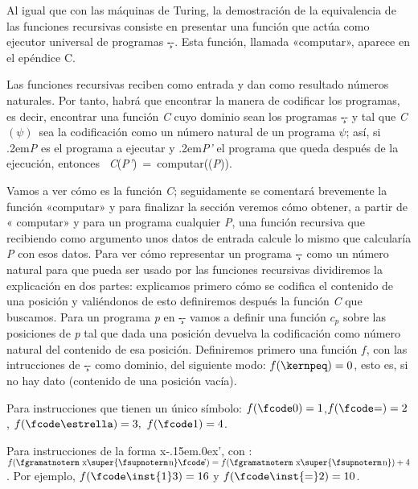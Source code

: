 Al igual que con las máquinas de Turing, la demostración de la equivalencia de las funciones
recursivas consiste en presentar una función que actúa como ejecutor universal de programas \c--.
Esta función, llamada «{\fgabrielen computar}», aparece en el epéndice C.

Las funciones recursivas reciben como entrada y dan como resultado números naturales. Por tanto,
habrá que encontrar la manera de codificar los programas, es decir, encontrar una función {\it C}
cuyo dominio sean los programas \c-- y tal que {\it C$ (\psi) $}\ sea la codificación
como un número natural de un programa $ \psi $; así, si \kern.2em{\it P\/} es el programa
a ejecutar y \kern.2em{\it P'\/} el programa que queda después de la ejecución, entonces \hbox{{\it
C}({\it P'}) = {\fgabrielen computar}(({\it P}))}.

Vamos a ver cómo es la función {\it C}; seguidamente se comentará brevemente la función
«{\fgabrielen computar}» y para finalizar la sección veremos cómo obtener, a partir de «{\fgabrielen
computar}» y para un programa cualquier {\it P}, una función recursiva que recibiendo como argumento
unos datos de entrada calcule lo mismo que calcularía {\it P} con esos datos.
Para ver cómo representar un programa \c-- como un número natural para que pueda ser usado por las
funciones recursivas dividiremos la explicación en dos partes: explicamos primero cómo se codifica
el contenido de una posición y valiéndonos de esto definiremos después la función {\it C} que
buscamos.
Para un programa {\it p} en \c-- vamos a definir una función $ c_p $ sobre las posiciones de {\it p}
tal que dada una posición devuelva la codificación como número natural del contenido de esa
posición. Definiremos primero una función $ f $, con las intrucciones de \c-- como dominio, del
siguiente modo:
\listanormal
$ f(\kernpeq)= 0$, esto es, si no hay dato (contenido de una posición vacía).

Para instrucciones que tienen un único símbolo:
\espacioej$ f(\hbox{\fcode0})= 1$,\hskip22pt$ f(\hbox{\fcode=})=2 $,\hskip22pt $
f(\hbox{\fcode\estrella})=3, $\hskip22pt $ f(\hbox{\fcode1})=4 $.

Para instrucciones de la forma {\fgramatnoterm x\fcode\kern-.15em\lower.0ex\hbox{’}}, con \nnat:
\espacioej$ f(\hbox{{\fgramatnoterm x\super{\fsupnoterm\kern.1em n}%
\fcode\kern-.15em\lower.0ex\hbox{’}}}) =f(\hbox{{\fgramatnoterm x\super{\fsupnoterm\kern.1em n}}})+4 $.
\finlista
Por ejemplo, $ f(\hbox{{\fcode\inst{1}3}})=16 $ y $ f(\hbox{{\fcode\inst{=}2}})=10 $.

